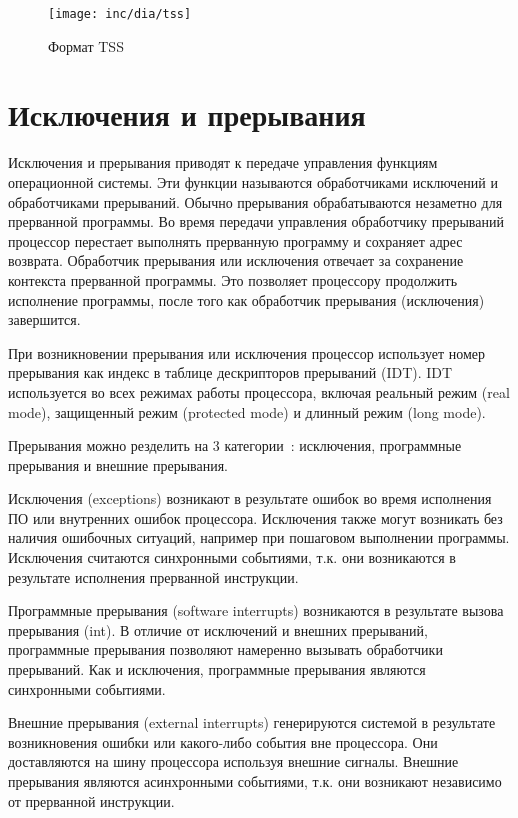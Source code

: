 \begin{figure}
  \centering
  \texttt{[image: inc/dia/tss]}
  \caption{Формат TSS}
  \label{fig:tss}
\end{figure}



\section{Исключения и прерывания}

Исключения и прерывания приводят к передаче управления функциям операционной
системы. Эти функции называются обработчиками исключений и обработчиками
прерываний. Обычно прерывания обрабатываются незаметно для прерванной
программы. Во время передачи управления обработчику прерываний процессор
перестает выполнять прерванную программу и сохраняет адрес возврата.
Обработчик прерывания или исключения отвечает за сохранение контекста
прерванной программы. Это позволяет процессору продолжить исполнение
программы, после того как обработчик прерывания (исключения) завершится.

При возникновении прерывания или исключения процессор использует номер
прерывания как индекс в таблице дескрипторов прерываний (IDT). IDT
используется во всех режимах работы процессора, включая реальный режим (real
mode), защищенный режим (protected mode) и длинный режим (long mode).

Прерывания можно резделить на 3 категории~\cite{amd_pm_v2}: исключения,
программные прерывания и внешние прерывания.

Исключения (exceptions) возникают в результате ошибок во время исполнения ПО или внутренних
ошибок процессора. Исключения также могут возникать без наличия ошибочных
ситуаций, например при пошаговом выполнении программы. Исключения считаются
синхронными событиями, т.к. они возникаются в результате исполнения прерванной
инструкции.

Программные прерывания (software interrupts) возникаются в результате вызова прерывания (int). В
отличие от исключений и внешних прерываний, программные прерывания позволяют
намеренно вызывать обработчики прерываний. Как и исключения, программные
прерывания являются синхронными событиями.

Внешние прерывания (external interrupts) генерируются системой в результате возникновения ошибки
или какого-либо события вне процессора. Они доставляются на шину процессора
используя внешние сигналы. Внешние прерывания являются асинхронными событиями,
т.к. они возникают независимо от прерванной инструкции.

